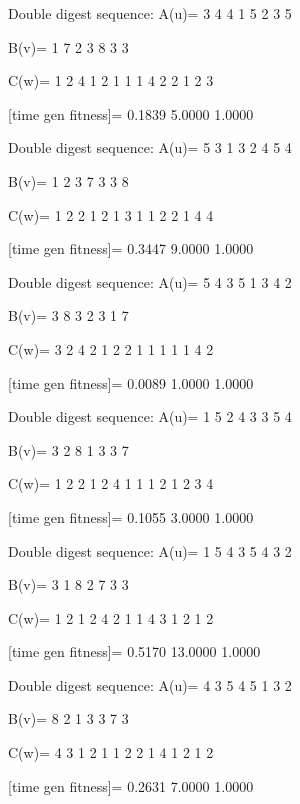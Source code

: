Double digest sequence:
A(u)=
     3     4     4     1     5     2     3     5

B(v)=
     1     7     2     3     8     3     3

C(w)=
     1     2     4     1     2     1     1     1     4     2     2     1     2     3

[time gen fitness]=
    0.1839    5.0000    1.0000

Double digest sequence:
A(u)=
     5     3     1     3     2     4     5     4

B(v)=
     1     2     3     7     3     3     8

C(w)=
     1     2     2     1     2     1     3     1     1     2     2     1     4     4

[time gen fitness]=
    0.3447    9.0000    1.0000

Double digest sequence:
A(u)=
     5     4     3     5     1     3     4     2

B(v)=
     3     8     3     2     3     1     7

C(w)=
     3     2     4     2     1     2     2     1     1     1     1     1     4     2

[time gen fitness]=
    0.0089    1.0000    1.0000

Double digest sequence:
A(u)=
     1     5     2     4     3     3     5     4

B(v)=
     3     2     8     1     3     3     7

C(w)=
     1     2     2     1     2     4     1     1     1     2     1     2     3     4

[time gen fitness]=
    0.1055    3.0000    1.0000

Double digest sequence:
A(u)=
     1     5     4     3     5     4     3     2

B(v)=
     3     1     8     2     7     3     3

C(w)=
     1     2     1     2     4     2     1     1     4     3     1     2     1     2

[time gen fitness]=
    0.5170   13.0000    1.0000

Double digest sequence:
A(u)=
     4     3     5     4     5     1     3     2

B(v)=
     8     2     1     3     3     7     3

C(w)=
     4     3     1     2     1     1     2     2     1     4     1     2     1     2

[time gen fitness]=
    0.2631    7.0000    1.0000

